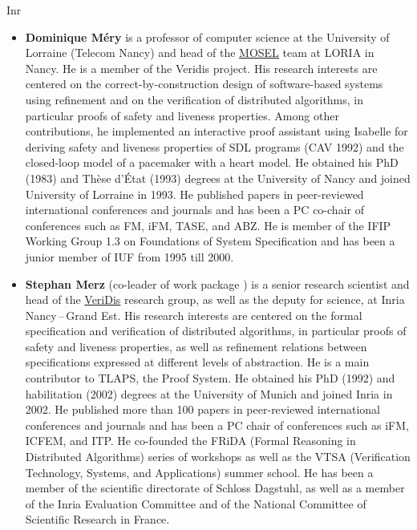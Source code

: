 \begin{sitedescription}{Inr}
\begin{itemize}
\item{\bf Dominique M\'ery}  is a professor of computer science at the
  University of Lorraine (Telecom Nancy)  and head of the
  \href{https://mosel.loria.fr}{MOSEL} team at LORIA in Nancy.
  He is a member of the Veridis project.
His research interests are centered on the   correct-by-construction
design  of software-based systems  using refinement and on the
verification   of distributed algorithms, in particular proofs of safety and liveness
properties. Among other contributions, he implemented an interactive
proof assistant using Isabelle  for deriving safety and liveness
properties of SDL programs (CAV 1992) and  the closed-loop model of
a pacemaker with a heart model.
He obtained his PhD (1983) and Thèse d'État (1993) degrees at the
University of Nancy and joined University of Lorraine in 1993. He published  papers
in peer-reviewed international conferences and journals and has been a PC co-chair
of conferences such as FM, iFM, TASE, and ABZ. He is member of the IFIP
Working Group 1.3 on Foundations of System Specification and has been a junior member of IUF from 1995 till 2000.

\item{\bf Stephan Merz} (co-leader of work package ) is a senior research
scientist and head of the \href{https://team.inria.fr/veridis/}{VeriDis}
research group, as well as the deputy for science, at Inria Nancy\,--\,Grand Est.
His research interests are centered on the formal specification and verification
of distributed algorithms, in particular proofs of safety and liveness
properties, as well as refinement relations between specifications expressed at
different levels of abstraction. He is a main contributor to TLAPS, the \tlaplus
Proof System. He obtained his PhD (1992) and habilitation (2002) degrees at the
University of Munich and joined Inria in 2002. He published more than 100 papers
in peer-reviewed international conferences and journals and has been a PC chair
of conferences such as iFM, ICFEM, and ITP. He co-founded the FRiDA (Formal
Reasoning in Distributed Algorithms) series of workshops as well as the VTSA
(Verification Technology, Systems, and Applications) summer school. He has been
a member of the scientific directorate of Schloss Dagstuhl, as well as a member
of the Inria Evaluation Committee and of the National Committee of Scientific
Research in France.


\end{itemize}
\end{sitedescription}
